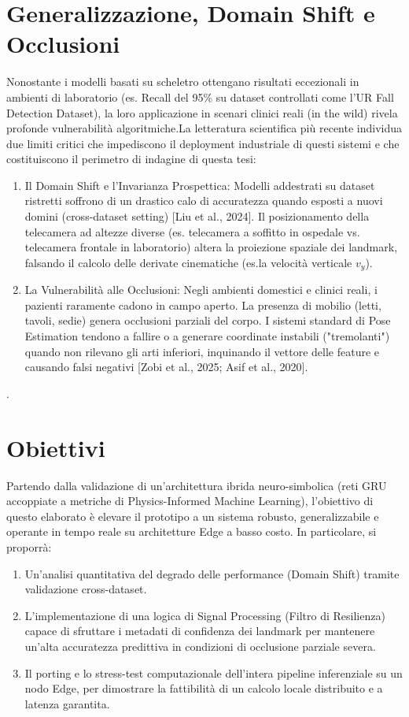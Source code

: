 \section{Generalizzazione, Domain Shift e Occlusioni}
Nonostante i modelli basati su scheletro ottengano risultati eccezionali in ambienti di laboratorio (es. Recall del 95\% su dataset controllati come l'UR Fall Detection Dataset), la loro applicazione in scenari clinici reali (in the wild) rivela profonde vulnerabilità algoritmiche.La letteratura scientifica più recente individua due limiti critici che impediscono il deployment industriale di questi sistemi e che costituiscono il perimetro di indagine di questa tesi:
\begin{enumerate}
    \item Il Domain Shift e l'Invarianza Prospettica: Modelli addestrati su dataset ristretti soffrono di un drastico calo di accuratezza quando esposti a nuovi domini (cross-dataset setting) [Liu et al., 2024]. Il posizionamento della telecamera ad altezze diverse (es. telecamera a soffitto in ospedale vs. telecamera frontale in laboratorio) altera la proiezione spaziale dei landmark, falsando il calcolo delle derivate cinematiche (es.la velocità verticale $v_y$). 
    \item La Vulnerabilità alle Occlusioni: Negli ambienti domestici e clinici reali, i pazienti raramente cadono in campo aperto. La presenza di mobilio (letti, tavoli, sedie) genera occlusioni parziali del corpo. I sistemi standard di Pose Estimation tendono a fallire o a generare coordinate instabili ("tremolanti") quando non rilevano gli arti inferiori, inquinando il vettore delle feature e causando falsi negativi [Zobi et al., 2025; Asif et al., 2020].
\end{enumerate}.

\section{Obiettivi}
Partendo dalla validazione di un'architettura ibrida neuro-simbolica (reti GRU accoppiate a metriche di Physics-Informed Machine Learning), l'obiettivo di questo elaborato è elevare il prototipo a un sistema robusto, generalizzabile e operante in tempo reale su architetture Edge a basso costo.
In particolare, si proporrà:
\begin{enumerate}
    \item Un'analisi quantitativa del degrado delle performance (Domain Shift) tramite validazione cross-dataset.
    \item L'implementazione di una logica di Signal Processing (Filtro di Resilienza) capace di sfruttare i metadati di confidenza dei landmark per mantenere un'alta accuratezza predittiva in condizioni di occlusione parziale severa.
    \item Il porting e lo stress-test computazionale dell'intera pipeline inferenziale su un nodo Edge, per dimostrare la fattibilità di un calcolo locale distribuito e a latenza garantita.
\end{enumerate}







